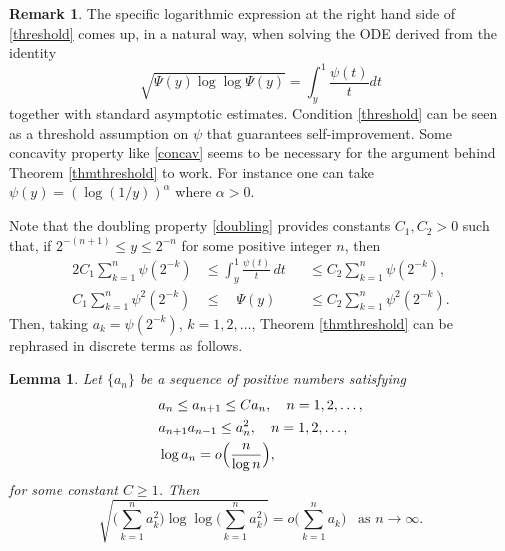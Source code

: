 \documentclass[11pt,letterpaper]{amsart}
\newtheorem{lem}{Lemma}[section]
\theoremstyle{definition}
\newtheorem{rem}{Remark}[section]
\numberwithin{equation}{section}
\begin{document}
\begin{rem}
The specific logarithmic expression at the right hand side of  \eqref{threshold} comes up, in a natural way, when solving the ODE derived from the identity
$$
\sqrt{\Psi (y) \log \log \Psi (y)} =  \int_y^1 \frac{\psi (t)}{t} dt
$$
together with standard asymptotic estimates. Condition \eqref{threshold} can be seen as a threshold assumption on $\psi$ that guarantees self-improvement. Some concavity property  like \eqref{concav} seems to be necessary for the argument behind Theorem  \ref{thmthreshold} to work. For instance one can take $\psi (y) = (\log (1/y))^\alpha$ where $\alpha >0$. 
\end{rem}

Note that the doubling property \eqref{doubling} provides constants $C_1, C_2 >0$ such that, if $2^{-(n+1)} \leq y \leq 2^{-n}$ for some positive integer $n$, then
\begin{alignat*}{2}
C_1 \sum_{k=1}^n \psi(2^{-k})    & \leq  \int_{y}^1 \frac{\psi(t)}{t} \, dt  && \leq   C_2 \sum_{k=1}^n \psi(2^{-k}) , \\
C_1 \sum_{k=1}^n \psi^2 (2^{-k})  & \leq  \quad  \Psi (y)   && \leq   C_2 \sum_{k=1}^n \psi^2 (2^{-k}) .
\end{alignat*}
Then, taking $a_k = \psi (2^{-k})$, $k=1,2,\ldots$, Theorem \ref{thmthreshold} can be rephrased in discrete terms as follows.

\begin{lem}\label{discrete}
Let $\{ a_n \}$ be a sequence of positive numbers satisfying
\begin{eqnarray}
& a_n \leq a_{n+1} \leq C a_n ,\quad  n=1,2,\ldots , \vspace{0.2cm} \label{crecdoub}\\
& a_{n+1}a_{n-1} \leq a^2_n , \quad n=1,2,\ldots , \vspace{0.2cm} \label{discconcav}\\
& \log a_n = \displaystyle o\Big ( \frac{n}{\log n}  \Big ) ,  \label{discthreshold}
\end{eqnarray}
for some constant $C \geq 1$. Then
\begin{equation}\label{discimprov}
\sqrt{\big ( \sum_{k=1}^n a_k^2 \big )\log \log \big ( \sum_{k=1}^n a_k^2 \big )} = o \Big ( \sum_{k=1}^n a_k \Big ) \, \, \, \, \, \text{as} \, \, n\to \infty . 
\end{equation}
\end{lem}
\end{document}
